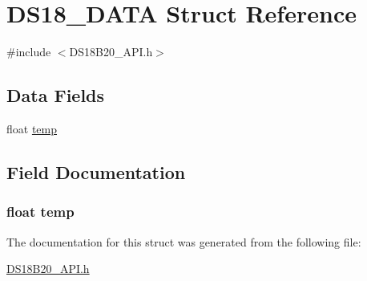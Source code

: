 \hypertarget{struct_d_s18___d_a_t_a}{}\section{D\+S18\+\_\+\+D\+A\+T\+A Struct Reference}
\label{struct_d_s18___d_a_t_a}


{\ttfamily \#include $<$D\+S18\+B20\+\_\+\+A\+P\+I.\+h$>$}

\subsection*{Data Fields}
\begin{DoxyCompactItemize}
\item 
float \hyperlink{struct_d_s18___d_a_t_a_a24d61a35b72d7299eb6b5f48e71a571b}{temp}
\end{DoxyCompactItemize}


\subsection{Field Documentation}
\hypertarget{struct_d_s18___d_a_t_a_a24d61a35b72d7299eb6b5f48e71a571b}{}
\subsubsection[{temp}]{\setlength{\rightskip}{0pt plus 5cm}float temp}\label{struct_d_s18___d_a_t_a_a24d61a35b72d7299eb6b5f48e71a571b}


The documentation for this struct was generated from the following file\+:\begin{DoxyCompactItemize}
\item 
\hyperlink{_d_s18_b20___a_p_i_8h}{D\+S18\+B20\+\_\+\+A\+P\+I.\+h}\end{DoxyCompactItemize}
